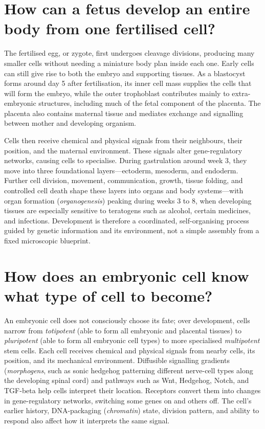 \documentclass[11pt,oneside]{report}
\begin{document}
\section{How can a fetus develop an entire body from one fertilised cell?}

The fertilised egg, or zygote, first undergoes cleavage divisions, producing
many smaller cells without needing a miniature body plan inside each one. Early
cells can still give rise to both the embryo and supporting tissues. As a
blastocyst forms around day 5 after fertilisation, its inner cell mass supplies
the cells that will form the embryo, while the outer trophoblast contributes
mainly to extra-embryonic structures, including much of the fetal component of
the placenta. The
placenta also contains maternal tissue and mediates exchange and signalling
between mother and developing organism.

Cells then receive chemical and physical signals from their neighbours, their
position, and the maternal environment. These signals alter gene-regulatory
networks, causing cells to specialise. During gastrulation around week 3, they move into three
foundational layers---ectoderm, mesoderm, and endoderm. Further cell division,
movement, communication, growth, tissue folding, and controlled cell death
shape these layers into organs and body systems—with organ formation
(\emph{organogenesis}) peaking during weeks 3 to 8, when developing tissues are
especially sensitive to teratogens such as alcohol, certain medicines, and
infections. Development is therefore a
coordinated, self-organising process guided by genetic information and its
environment, not a simple assembly from a fixed microscopic blueprint.

\section{How does an embryonic cell know what type of cell to become?}

An embryonic cell does not consciously choose its fate; over development,
cells narrow from \emph{totipotent} (able to form all embryonic and placental
tissues) to \emph{pluripotent} (able to form all embryonic cell types) to more
specialised \emph{multipotent} stem cells. Each cell receives chemical
and physical signals from nearby cells, its position, and its mechanical
environment. Diffusible signalling gradients (\emph{morphogens}, such as sonic
hedgehog patterning different nerve-cell types along the developing spinal
cord) and pathways such as Wnt, Hedgehog, Notch, and TGF-beta help cells
interpret their location. Receptors convert them into changes in
gene-regulatory networks, switching some genes on and others off. The cell's
earlier history, DNA-packaging (\emph{chromatin}) state, division pattern,
and ability to respond also affect how it interprets the same signal.
\end{document}
